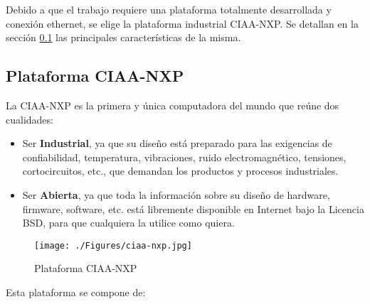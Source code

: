 Debido a que el trabajo requiere una plataforma totalmente desarrollada y conexión ethernet, se elige la plataforma industrial CIAA-NXP. Se detallan en la sección \ref{sec:ciaa-nxp} las principales características de la misma.

\subsection{Plataforma CIAA-NXP}
\label{sec:ciaa-nxp}

La CIAA-NXP es la primera y única computadora del mundo que reúne dos cualidades:

\begin{itemize}
\item 
Ser \textbf{Industrial}, ya que su diseño está preparado para las exigencias de confiabilidad, temperatura, vibraciones, ruido electromagnético, tensiones, cortocircuitos, etc., que demandan los productos y procesos industriales.
\item 
Ser \textbf{Abierta}, ya que toda la información sobre su diseño de hardware, firmware, software, etc. está libremente disponible en Internet bajo la Licencia BSD, para que cualquiera la utilice como quiera.
\end{itemize}

\begin{figure}[h!]
	\centering
    \texttt{[image: ./Figures/ciaa-nxp.jpg]}
	\label{fig:ciaa-nxp}
	\caption{Plataforma CIAA-NXP}
\end{figure}


\noindent Esta plataforma se compone de:

